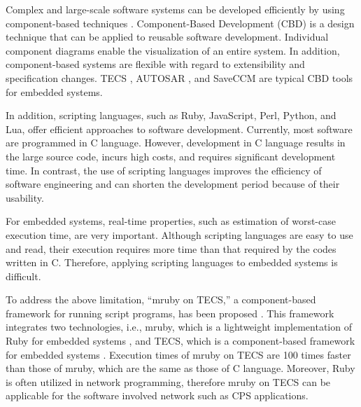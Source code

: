\documentclass[conference]{IEEEtran/IEEEtran/IEEEtran}
\begin{document}
Complex and large-scale software systems can be developed efficiently by using component-based techniques \cite{par:Crnkovic}.
Component-Based Development (CBD) is a design technique that can be applied to reusable software development.
Individual component diagrams enable the visualization of an entire system.
In addition, component-based systems are flexible with regard to extensibility and specification changes.
TECS \cite{par:TECS}, AUTOSAR \cite{url:AUTOSAR}, and SaveCCM \cite{par:SAVEapproach} are typical CBD tools for embedded systems.

In addition, scripting languages, such as Ruby, JavaScript, Perl, Python, and Lua, offer efficient approaches to software development.
Currently, most software are programmed in C language.
However, development in C language results in the large source code, incurs high costs, and requires significant development time.
In contrast, the use of scripting languages improves the efficiency of software engineering and can shorten the development period because of their usability. 

For embedded systems, real-time properties, such as estimation of worst-case execution time, are very important.
Although scripting languages are easy to use and read, their execution requires more time than that required by the codes written in C.
Therefore, applying scripting languages to embedded systems is difficult.

To address the above limitation, ``mruby on TECS,'' a component-based framework for running script programs, has been proposed \cite{par:mrubyonTECS}.
This framework integrates two technologies, i.e., mruby, which is a lightweight implementation of Ruby for embedded systems \cite{par:mruby}, and TECS, which is a component-based framework for embedded systems \cite{par:TECS}.
Execution times of mruby on TECS are 100 times faster than those of mruby, which are the same as those of C language.
Moreover, Ruby is often utilized in network programming, therefore mruby on TECS can be applicable for the software involved network such as CPS applications.
\end{document}
